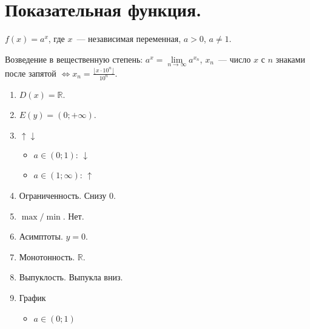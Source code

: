 \documentclass{article}
\begin{document}
	\section{Показательная функция.}
	\begin{definition}
		$f(x) = a^x$, где $x$~--- независимая переменная, $a > 0$, $a \not= 1$.
	\end{definition}
	\begin{definition}
		Возведение в вещественную степень: $a^x = \lim\limits_{n \rightarrow \infty} a^{x_n}$, $x_n$~--- число $x$ с $n$ знаками после запятой $\Leftrightarrow x_n = \frac{\lfloor x \cdot 10^n \rfloor}{10^n}$.
	\end{definition}
	\begin{property}
		\begin{enumerate}
			\item $D(x) = \mathbb{R}$.
			\item $E(y) = (0; +\infty)$.
			\item $\uparrow \downarrow$
			\begin{itemize}
				\item $a \in (0; 1)$: $\downarrow$
				\item $a \in (1; \infty)$: $\uparrow$
			\end{itemize}
			\item Ограниченность. Снизу $0$.
			\item $\max/\min$. Нет.
			\item Асимптоты. $y = 0$.
			\item Монотонность. $\mathbb{R}$.
			\item Выпуклость. Выпукла вниз.
			\item График
			\begin{itemize}
				\item $a \in (0; 1)$
				\begin{figure}[H]

\end{figure}
\end{itemize}
\end{enumerate}
\end{property}
\end{document}

